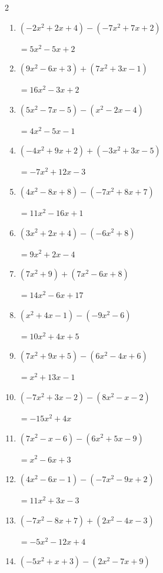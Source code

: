 \begin{multicols}{2}
\begin{enumerate}
  \item $(-2x^{2}+2x+4)-(-7x^{2}+7x+2)$

        $=5x^{2}-5x+2$

  \item $(9x^{2}-6x+3)+(7x^{2}+3x-1)$

        $=16x^{2}-3x+2$

  \item $(5x^{2}-7x-5)-(x^{2}-2x-4)$

        $=4x^{2}-5x-1$

  \item $(-4x^{2}+9x+2)+(-3x^{2}+3x-5)$

        $=-7x^{2}+12x-3$

  \item $(4x^{2}-8x+8)-(-7x^{2}+8x+7)$

        $=11x^{2}-16x+1$

  \item $(3x^{2}+2x+4)-(-6x^{2}+8)$

        $=9x^{2}+2x-4$

\columnbreak %

\resetques

  \item $(7x^{2}+9)+(7x^{2}-6x+8)$

        $=14x^{2}-6x+17$

  \item $(x^{2}+4x-1)-(-9x^{2}-6)$

        $=10x^{2}+4x+5$

  \item $(7x^{2}+9x+5)-(6x^{2}-4x+6)$

        $=x^{2}+13x-1$

  \item $(-7x^{2}+3x-2)-(8x^{2}-x-2)$

        $=-15x^{2}+4x$

  \item $(7x^{2}-x-6)-(6x^{2}+5x-9)$

        $=x^{2}-6x+3$

  \item $(4x^{2}-6x-1)-(-7x^{2}-9x+2)$

        $=11x^{2}+3x-3$

  \item $(-7x^{2}-8x+7)+(2x^{2}-4x-3)$

        $=-5x^{2}-12x+4$

  \item $(-5x^{2}+x+3)-(2x^{2}-7x+9)$


\end{enumerate}
\end{multicols}
